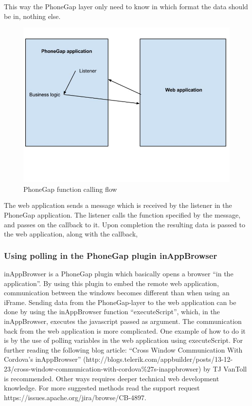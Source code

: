 \documentclass{./tex/cslthse-msc}
\begin{document}
This way the PhoneGap layer only need to know in which format the data should be in, nothing else. 
\begin{figure}[ht!]
    \centering
    \includegraphics[width=120mm,natwidth=800,natheight=600]{./img/phoneGapFlow.jpg}
    \caption{PhoneGap function calling flow \label{caption-phonegap-flow}}
\end{figure}
\newline
The web application sends a message which is received by the listener in the PhoneGap application. The listener calls the function specified by the message, and passes on the callback to it. Upon completion the resulting data is passed to the web application, along with the callback, 

\subsubsection{Using polling in the PhoneGap plugin inAppBrowser}

inAppBrowser is a PhoneGap plugin which basically opens a browser “in the application”. By using this plugin to embed the remote web application, communication between the windows becomes different than when using an iFrame. Sending data from the PhoneGap-layer to the web application can be done by using the inAppBrowser function “executeScript”, which, in the inAppBrowser, executes the javascript passed as argument.
The communication back from the web application is more complicated. One example of how to do it is by the use of polling variables in the web application using executeScript. For further reading the following blog article: “Cross Window Communication With Cordova’s inAppBrowser” (http://blogs.telerik.com/appbuilder/posts/13-12-23/cross-window-communication-with-cordova\%27s-inappbrowser) by TJ VanToll is recommended. 
\newline\newline
Other ways requires deeper technical web development knowledge. For more suggested methods read the support request https://issues.apache.org/jira/browse/CB-4897.
\end{document}
